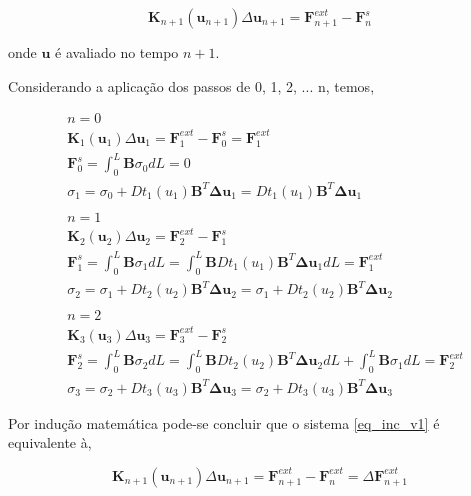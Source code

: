 \documentclass[12pt,a4paper]{article}
\newcommand{\diff}[1]{d#1}
\begin{document}
\begin{equation}
\mathbf{K}_{n+1}(\mathbf{u}_{n+1}) \Delta \mathbf{u}_{n+1} = \mathbf{F}^{ext}_{n+1} - \mathbf{F}^s_n 
\label{eq_inc_v1}
\end{equation}

\noindent
onde $\mathbf{u}$ é avaliado no tempo $n+1$.

Considerando a aplicação dos  passos de 0, 1, 2, ... n, temos,


\begin{align*}
&n = 0\\
&\mathbf{K}_{1}(\mathbf{u}_{1}) \Delta \mathbf{u}_{1} = \mathbf{F}^{ext}_{1} - \mathbf{F}^s_0 = \mathbf{F}^{ext}_{1}\\
&\mathbf{F}^s_0 = \int_0^L \mathbf{B} \sigma_{0}\diff{L} = 0\\
&\sigma_{1} = \sigma_{0} + Dt_{1}\left(u_{1}\right) \mathbf{B}^T \mathbf{\Delta u}_{1} = Dt_{1}\left(u_{1}\right) \mathbf{B}^T \mathbf{\Delta u}_{1}\\
&\\
&n = 1\\
&\mathbf{K}_{2}(\mathbf{u}_{2}) \Delta \mathbf{u}_{2} = \mathbf{F}^{ext}_{2} - \mathbf{F}^s_1\\
&\mathbf{F}^s_1 = \int_0^L \mathbf{B} \sigma_{1}\diff{L} = \int_0^L \mathbf{B} Dt_{1}\left(u_{1}\right) \mathbf{B}^T \mathbf{\Delta u}_{1}\diff{L}=\mathbf{F}^{ext}_{1}\\
&\sigma_{2} = \sigma_{1} + Dt_{2}\left(u_{2}\right) \mathbf{B}^T \mathbf{\Delta u}_{2} = \sigma_{1} +Dt_{2}\left(u_{2}\right) \mathbf{B}^T \mathbf{\Delta u}_{2} \\
&\\
&n = 2\\
&\mathbf{K}_{3}(\mathbf{u}_{3}) \Delta \mathbf{u}_{3} = \mathbf{F}^{ext}_{3} - \mathbf{F}^s_2\\
&\mathbf{F}^s_2 = \int_0^L \mathbf{B} \sigma_{2}\diff{L} = \int_0^L \mathbf{B} Dt_{2}\left(u_{2}\right) \mathbf{B}^T \mathbf{\Delta u}_{2}\diff{L} + \int_0^L \mathbf{B} \sigma_{1}\diff{L} = \mathbf{F}^{ext}_{2}\\
&\sigma_{3} = \sigma_{2} + Dt_{3}\left(u_{3}\right) \mathbf{B}^T \mathbf{\Delta u}_{3} = \sigma_{2} +Dt_{3}\left(u_{3}\right) \mathbf{B}^T \mathbf{\Delta u}_{3}
\end{align*}
 
Por indução matemática pode-se concluir que o sistema \ref{eq_inc_v1} é equivalente à,

\begin{equation}
\mathbf{K}_{n+1}(\mathbf{u}_{n+1}) \Delta \mathbf{u}_{n+1} = \mathbf{F}^{ext}_{n+1} - \mathbf{F}^{ext}_{n} = \Delta \mathbf{F}^{ext}_{n+1} 
\label{eq_inc_v2}
\end{equation}
\end{document}
